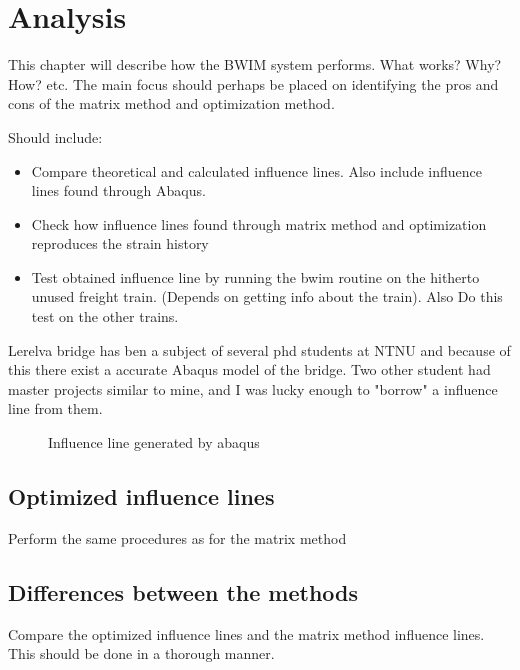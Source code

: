 \section{Analysis}

This chapter will describe how the BWIM system performs. What works? Why? How? etc.
The main focus should perhaps be placed on identifying the pros and cons of the matrix method and optimization method.

Should include:
\begin{itemize}
\item Compare theoretical and calculated influence lines. Also include influence lines found through Abaqus.
\item Check how influence lines found through matrix method and optimization reproduces the strain history
\item Test obtained influence line by running the bwim routine on the hitherto unused freight train. (Depends on getting info about the train). Also Do this test on the other trains.

\end{itemize}
Lerelva bridge has ben a subject of several phd students at NTNU and because of this there exist a accurate Abaqus model of the bridge. Two other student had master projects similar to mine, and I was lucky enough to "borrow" a influence line from them.
\begin{figure}[H]
	\begin{adjustbox}{center}
		
	\end{adjustbox}
	\caption{Influence line generated by abaqus}
	\label{fig:inflAbaqus}
\end{figure}





\subsection{Optimized influence lines}
Perform the same procedures as for the matrix method

\subsection{Differences between the methods}
Compare the optimized influence lines and the matrix method influence lines. This should be done in a thorough manner.
